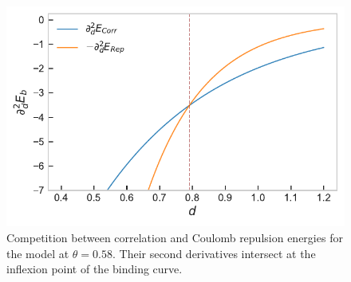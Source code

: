 \documentclass[reprint, amsmath, amssymb, aps, pra]{revtex4-2}
\begin{document}
    \begin{figure}
        \includegraphics[scale=0.75]{figures/repulsion_vs_correlation_2nd_derivative.pdf}
        \caption{\label{fig:second_derivatives}Competition between correlation and Coulomb repulsion energies for the model at $\theta=0.58$. Their second derivatives intersect at the inflexion point of the binding curve.}
    \end{figure}
\end{document}
